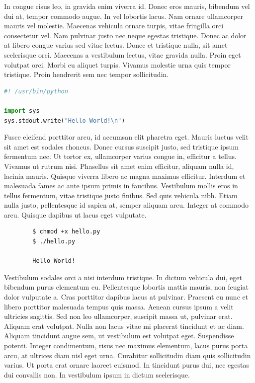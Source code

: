 \documentclass{article}
\begin{document}
In congue risus leo, in gravida enim viverra id. Donec eros mauris, bibendum vel dui at, tempor commodo augue. In vel lobortis lacus. Nam ornare ullamcorper mauris vel molestie. Maecenas vehicula ornare turpis, vitae fringilla orci consectetur vel. Nam pulvinar justo nec neque egestas tristique. Donec ac dolor at libero congue varius sed vitae lectus. Donec et tristique nulla, sit amet scelerisque orci. Maecenas a vestibulum lectus, vitae gravida nulla. Proin eget volutpat orci. Morbi eu aliquet turpis. Vivamus molestie urna quis tempor tristique. Proin hendrerit sem nec tempor sollicitudin.

\begin{file}[hello.py]
\begin{lstlisting}[language=Python]
#! /usr/bin/python

import sys
sys.stdout.write("Hello World!\n")
\end{lstlisting}
\end{file}

Fusce eleifend porttitor arcu, id accumsan elit pharetra eget. Mauris luctus velit sit amet est sodales rhoncus. Donec cursus suscipit justo, sed tristique ipsum fermentum nec. Ut tortor ex, ullamcorper varius congue in, efficitur a tellus. Vivamus ut rutrum nisi. Phasellus sit amet enim efficitur, aliquam nulla id, lacinia mauris. Quisque viverra libero ac magna maximus efficitur. Interdum et malesuada fames ac ante ipsum primis in faucibus. Vestibulum mollis eros in tellus fermentum, vitae tristique justo finibus. Sed quis vehicula nibh. Etiam nulla justo, pellentesque id sapien at, semper aliquam arcu. Integer at commodo arcu. Quisque dapibus ut lacus eget vulputate.

\begin{commandline}
	\begin{verbatim}
		$ chmod +x hello.py
		$ ./hello.py

		Hello World!
	\end{verbatim}
\end{commandline}

Vestibulum sodales orci a nisi interdum tristique. In dictum vehicula dui, eget bibendum purus elementum eu. Pellentesque lobortis mattis mauris, non feugiat dolor vulputate a. Cras porttitor dapibus lacus at pulvinar. Praesent eu nunc et libero porttitor malesuada tempus quis massa. Aenean cursus ipsum a velit ultricies sagittis. Sed non leo ullamcorper, suscipit massa ut, pulvinar erat. Aliquam erat volutpat. Nulla non lacus vitae mi placerat tincidunt et ac diam. Aliquam tincidunt augue sem, ut vestibulum est volutpat eget. Suspendisse potenti. Integer condimentum, risus nec maximus elementum, lacus purus porta arcu, at ultrices diam nisl eget urna. Curabitur sollicitudin diam quis sollicitudin varius. Ut porta erat ornare laoreet euismod. In tincidunt purus dui, nec egestas dui convallis non. In vestibulum ipsum in dictum scelerisque.
\end{document}
